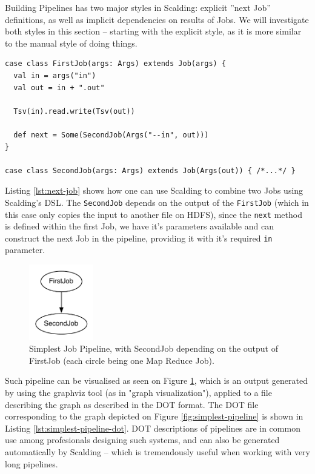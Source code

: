 Building Pipelines has two major styles in Scalding: explicit ''next Job'' definitions, as well as implicit dependencies on results of Jobs. We will investigate both styles in this section -- starting with the explicit style, as it is more similar to the manual style of doing things.

\begin{lstlisting}[caption={Explicit ''next job'' definition within a Scalding Job class}, label={lst:next-job}]
case class FirstJob(args: Args) extends Job(args) {
  val in = args("in")
  val out = in + ".out"
  
  Tsv(in).read.write(Tsv(out))
  
  def next = Some(SecondJob(Args("--in", out)))
}

case class SecondJob(args: Args) extends Job(Args(out)) { /*...*/ }
\end{lstlisting}

Listing \ref{lst:next-job} shows how one can use Scalding to combine two Jobs using Scalding's DSL. The \verb|SecondJob| depends on the output of the \verb|FirstJob| (which in this case only copies the input to another file on HDFS), since the \verb|next| method is defined within the first Job, we have it's parameters available and can construct the next Job in the pipeline, providing it with it's required \verb|in| parameter. 

\begin{figure}[ch!]
  \centering
  \includegraphics[width=0.25\textwidth]{img/simplest-pipeline}
  \caption{Simplest Job Pipeline, with SecondJob depending on the output of FirstJob (each circle being one Map Reduce Job).}
  \label{fig:simplect-pipeline}
\end{figure}

Such pipeline can be visualised as seen on Figure \ref{fig:simplect-pipeline}, which is an output generated by using the graphviz tool (as in "graph visualization"), applied to a file describing the graph as described in the DOT format. The DOT file corresponding to the graph depicted on Figure \ref{fig:simplest-pipeline} is shown in Listing \ref{lst:simplest-pipeline-dot}. DOT descriptions of pipelines are in common use among profesionals designing such systems, and can also be generated automatically by Scalding -- which is tremendously useful when working with very long pipelines.


